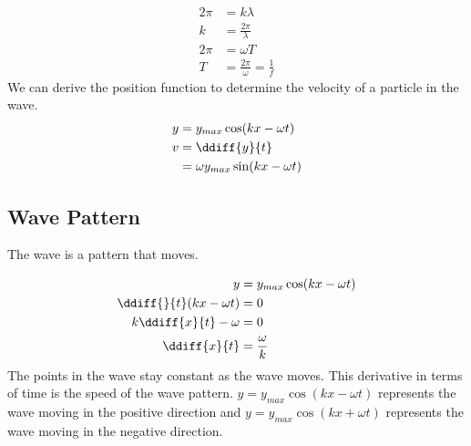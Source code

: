 \documentclass{math}
\begin{document}
\begin{align*}
  2\pi &= k\lambda \\
  k &= \frac{2\pi}{\lambda} \\
  2\pi &= \omega T \\
  T &= \frac{2\pi}{\omega} = \frac{1}{f}
\end{align*}
We can derive the position function to determine the velocity of a particle in
the wave.
\begin{align*}
  y &= y_{max}\cos(kx-\omega t) \\
  v &= \ddiff{y}{t} \\
  &= \omega y_{max}\sin(kx-\omega t)
\end{align*}

\subsection*{Wave Pattern}
The wave is a pattern that moves.
\begin{center}
\end{center}
\begin{align*}
  y &= y_{max}\cos(kx-\omega t) \\
  \ddiff{}{t}(kx-\omega t) &= 0 \\
  k\ddiff{x}{t}-\omega &= 0 \\
  \ddiff{x}{t} &= \frac{\omega}{k}
\end{align*}
The points in the wave stay constant as the wave moves. This derivative in terms
of time is the speed of the wave pattern. \( y = y_{max}\cos(kx-\omega t) \)
represents the wave moving in the positive direction and \( y =
y_{max}\cos(kx+\omega t) \) represents the wave moving in the negative
direction.
\end{document}
